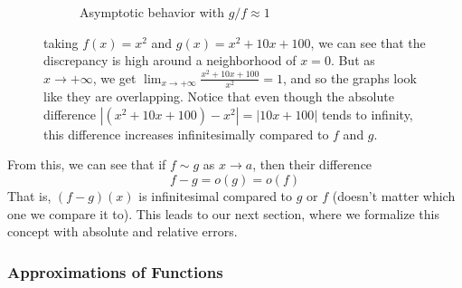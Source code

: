 \begin{example}
\begin{figure}[H]
\begin{subfigure}[b]{0.48\textwidth}
          \caption{Asymptotic behavior with $g/f \approx 1$}
          \label{fig:asymptotic}
        \end{subfigure}
        \caption{taking $f(x) = x^2$ and $g(x) = x^2 + 10x + 100$, we can see that the discrepancy is high around a neighborhood of $x = 0$. But as $x \rightarrow +\infty$, we get $\lim_{x \rightarrow + \infty} \frac{x^2 + 10x + 100}{x^2} = 1$, and so the graphs look like they are overlapping. Notice that even though the absolute difference $|(x^2 + 10x + 100) - x^2| = |10x + 100|$ tends to infinity, this difference increases infinitesimally compared to $f$ and $g$. }
        \label{fig:function-ratios}
      \end{figure}
    \end{example}

    From this, we can see that if $f \sim g$ as $x \rightarrow a$, then their difference 
    \begin{equation}
      f - g = o(g) = o(f)
    \end{equation}
    That is, $(f-g)(x)$ is infinitesimal compared to $g$ or $f$ (doesn't matter which one we compare it to). This leads to our next section, where we formalize this concept with absolute and relative errors. 

  \subsubsection{Approximations of Functions}

